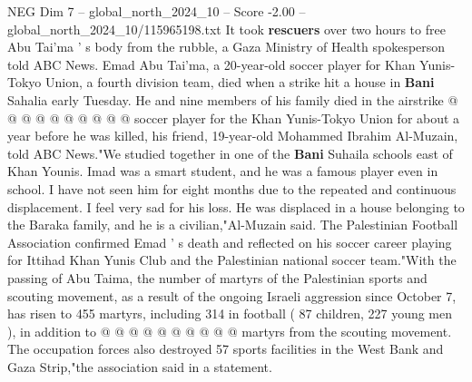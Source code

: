 \begin{textsample}{NEG Dim 7 – global\_north\_2024\_10 – Score -2.00 – global\_north\_2024\_10/115965198.txt}
It took \textbf{rescuers} over two hours to free Abu Tai'ma ' s body from the rubble, a Gaza Ministry of Health spokesperson told ABC News.
Emad Abu Tai'ma, a 20-year-old soccer player for Khan Yunis-Tokyo Union, a fourth division team, died when a strike hit a house in \textbf{Bani} Sahalia early Tuesday.
He and nine members of his family died in the airstrike @ @ @ @ @ @ @ @ @ @ soccer player for the Khan Yunis-Tokyo Union for about a year before he was killed, his friend, 19-year-old Mohammed Ibrahim Al-Muzain, told ABC News."We studied together in one of the \textbf{Bani} Suhaila schools east of Khan Younis.
Imad was a smart student, and he was a famous player even in school.
I have not seen him for eight months due to the repeated and continuous displacement.
I feel very sad for his loss.
He was displaced in a house belonging to the Baraka family, and he is a civilian,"Al-Muzain said.
The Palestinian Football Association confirmed Emad ' s death and reflected on his soccer career playing for Ittihad Khan Yunis Club and the Palestinian national soccer team."With the passing of Abu Taima, the number of martyrs of the Palestinian sports and scouting movement, as a result of the ongoing Israeli aggression since October 7, has risen to 455 martyrs, including 314 in football ( 87 children, 227 young men ), in addition to @ @ @ @ @ @ @ @ @ @ martyrs from the scouting movement.
The occupation forces also destroyed 57 sports facilities in the West Bank and Gaza Strip,"the association said in a statement.

\end{textsample}
